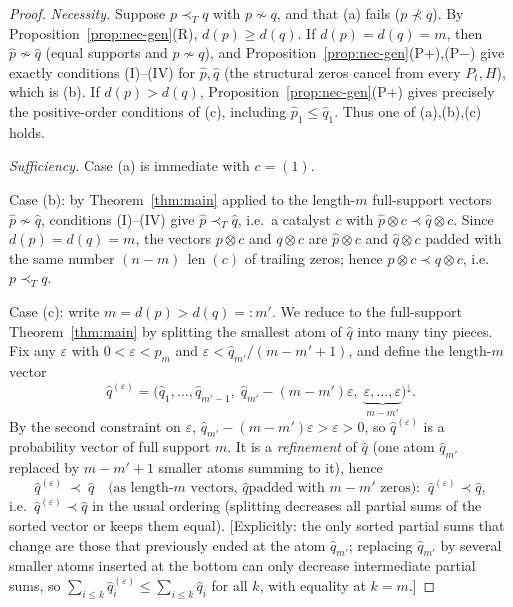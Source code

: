 \documentclass{amsart}
\theoremstyle{plain}
\theoremstyle{definition}
\newcommand{\maj}{\prec}
\newcommand{\trump}{\prec_T}
\begin{document}
\begin{proof}
\emph{Necessity.} Suppose $p\trump q$ with $p\not\sim q$, and that (a) fails
($p\not\maj q$). By Proposition~\ref{prop:nec-gen}(R), $d(p)\ge d(q)$. If $d(p)=d(q)=m$,
then $\hat p\not\sim\hat q$ (equal supports and $p\not\sim q$), and
Proposition~\ref{prop:nec-gen}(P+),(P$-$) give exactly conditions (I)--(IV) for
$\hat p,\hat q$ (the structural zeros cancel from every $P_t,H$), which is (b). If
$d(p)>d(q)$, Proposition~\ref{prop:nec-gen}(P+) gives precisely the positive-order
conditions of (c), including $\hat p_1\le\hat q_1$. Thus one of (a),(b),(c) holds.

\smallskip
\emph{Sufficiency.} Case (a) is immediate with $c=(1)$.

Case (b): by Theorem~\ref{thm:main} applied to the length-$m$ full-support vectors
$\hat p\not\sim\hat q$, conditions (I)--(IV) give $\hat p\trump\hat q$, i.e.\ a catalyst
$c$ with $\hat p\otimes c\maj\hat q\otimes c$. Since $d(p)=d(q)=m$, the vectors
$p\otimes c$ and $q\otimes c$ are $\hat p\otimes c$ and $\hat q\otimes c$ padded with
the same number $(n-m)\,\operatorname{len}(c)$ of trailing zeros; hence
$p\otimes c\maj q\otimes c$, i.e.\ $p\trump q$.

Case (c): write $m=d(p)>d(q)=:m'$. We reduce to the full-support
Theorem~\ref{thm:main} by splitting the smallest atom of $\hat q$ into many tiny pieces.
Fix any $\varepsilon$ with $0<\varepsilon<\hat p_m$ and
$\varepsilon<\hat q_{m'}/(m-m'+1)$, and define the length-$m$ vector
\[
   \hat q^{(\varepsilon)}=\Big(\hat q_1,\dots,\hat q_{m'-1},\;
   \hat q_{m'}-(m-m')\varepsilon,\;
   \underbrace{\varepsilon,\dots,\varepsilon}_{m-m'}\Big)^{\downarrow}.
\]
By the second constraint on $\varepsilon$, $\hat q_{m'}-(m-m')\varepsilon>\varepsilon>0$,
so $\hat q^{(\varepsilon)}$ is a probability vector of full support $m$. It is a
\emph{refinement} of $\hat q$ (one atom $\hat q_{m'}$ replaced by $m-m'+1$ smaller atoms
summing to it), hence
\begin{equation}\label{eq:refine}
   \hat q^{(\varepsilon)}\ \maj\ \hat q\quad\text{(as length-$m$ vectors, $\hat q$
   padded with $m-m'$ zeros): }\ \hat q^{(\varepsilon)}\maj\hat q,
\end{equation}
i.e.\ $\hat q^{(\varepsilon)}\prec\hat q$ in the usual ordering (splitting decreases
all partial sums of the sorted vector or keeps them equal). [Explicitly: the only
sorted partial sums that change are those that previously ended at the atom
$\hat q_{m'}$; replacing $\hat q_{m'}$ by several smaller atoms inserted at the bottom
can only decrease intermediate partial sums, so $\sum_{i\le k}\hat q^{(\varepsilon)}_i
\le\sum_{i\le k}\hat q_i$ for all $k$, with equality at $k=m$.]


\end{proof}
\end{document}
